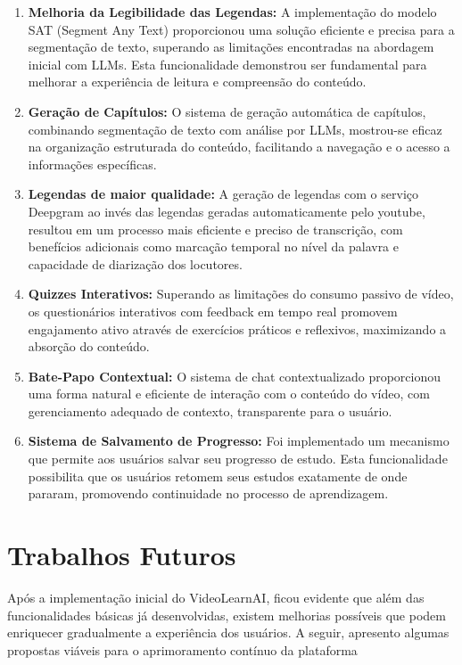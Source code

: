 \documentclass[tcc,capa]{texufpel}
\begin{document}
\begin{enumerate}
    \item \textbf{Melhoria da Legibilidade das Legendas:} A implementação do modelo SAT (Segment Any Text) proporcionou uma solução eficiente e precisa para a segmentação de texto, superando as limitações encontradas na abordagem inicial com LLMs. Esta funcionalidade demonstrou ser fundamental para melhorar a experiência de leitura e compreensão do conteúdo.

    \item \textbf{Geração de Capítulos:} O sistema de geração automática de capítulos, combinando segmentação de texto com análise por LLMs, mostrou-se eficaz na organização estruturada do conteúdo, facilitando a navegação e o acesso a informações específicas.

    \item \textbf{Legendas de maior qualidade:} A geração de legendas com o serviço Deepgram ao invés das legendas geradas automaticamente pelo youtube, resultou em um processo mais eficiente e preciso de transcrição, com benefícios adicionais como marcação temporal no nível da palavra e capacidade de diarização dos locutores.

    \item \textbf{Quizzes Interativos:} Superando as limitações do consumo passivo de vídeo, os questionários interativos com feedback em tempo real promovem engajamento ativo através de exercícios práticos e reflexivos, maximizando a absorção do conteúdo.

    \item \textbf{Bate-Papo Contextual:} O sistema de chat contextualizado proporcionou uma forma natural e eficiente de interação com o conteúdo do vídeo, com gerenciamento adequado de contexto, transparente para o usuário.

    \item \textbf{Sistema de Salvamento de Progresso:} Foi implementado um mecanismo que permite aos usuários salvar seu progresso de estudo. Esta funcionalidade possibilita que os usuários retomem seus estudos exatamente de onde pararam, promovendo continuidade no processo de aprendizagem.
  \end{enumerate}

\section{Trabalhos Futuros}

Após a implementação inicial do VideoLearnAI, ficou evidente que além das funcionalidades básicas já desenvolvidas, existem melhorias possíveis que podem enriquecer gradualmente a experiência dos usuários. A seguir, apresento algumas propostas viáveis para o aprimoramento contínuo da plataforma
\end{document}
